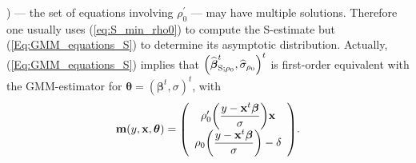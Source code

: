 ) --- the set of equations involving $\rho_{0}^{\prime}$ --- may have multiple
solutions. Therefore one usually uses (\ref{eq:S_min_rho0}) to compute the
S-estimate but (\ref{Eq:GMM_equations_S}) to determine its asymptotic
distribution. Actually, (\ref{Eq:GMM_equations_S}) implies that $\left(
\sthat{\boldsymbol\beta}_{\mathrm{S};\rho_{0}}^{t},\sthat{\sigma}%
_{\rho_{0}}\right)  ^{t}$ is first-order equivalent with the GMM-estimator for
$\boldsymbol{\theta}=\left(  \boldsymbol\beta^{t},\sigma\right)  ^{t}$,
with
\[
\mathbf{m}\left(  y,\stvec{x},\boldsymbol{\theta}\right)  =\left(
\begin{array}
[c]{c}%
\rho_{0}^{\prime}\left(  \dfrac{y-\stvec{x}^{t}\boldsymbol\beta}{\sigma
}\right)  \stvec{x}\\
\rho_{0}\left(  \dfrac{y-\stvec{x}^{t}\boldsymbol\beta}{\sigma}\right)
-\delta
\end{array}
\right)  .
\]


